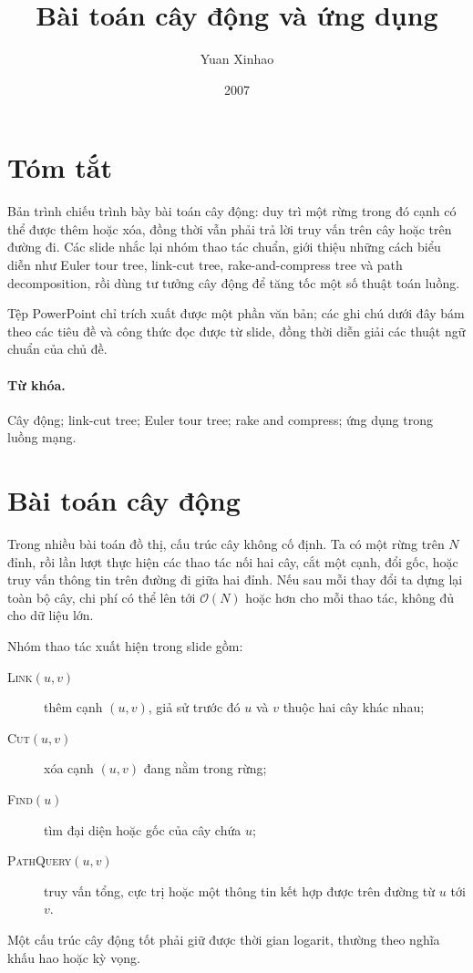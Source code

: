 \documentclass[11pt]{article}
\title{Bài toán cây động và ứng dụng}
\author{Yuan Xinhao}
\date{2007}
\newcommand{\Oh}{\mathcal{O}}
\begin{document}
\maketitle


\section*{Tóm tắt}

Bản trình chiếu trình bày bài toán cây động: duy trì một rừng trong đó cạnh
có thể được thêm hoặc xóa, đồng thời vẫn phải trả lời truy vấn trên cây hoặc
trên đường đi. Các slide nhắc lại nhóm thao tác chuẩn, giới thiệu những cách
biểu diễn như Euler tour tree, link-cut tree, rake-and-compress tree và path
decomposition, rồi dùng tư tưởng cây động để tăng tốc một số thuật toán luồng.

Tệp PowerPoint chỉ trích xuất được một phần văn bản; các ghi chú dưới đây bám
theo các tiêu đề và công thức đọc được từ slide, đồng thời diễn giải các
thuật ngữ chuẩn của chủ đề.

\paragraph{Từ khóa.}
Cây động; link-cut tree; Euler tour tree; rake and compress; ứng dụng trong
luồng mạng.

\section{Bài toán cây động}

Trong nhiều bài toán đồ thị, cấu trúc cây không cố định. Ta có một rừng trên
\(N\) đỉnh, rồi lần lượt thực hiện các thao tác nối hai cây, cắt một cạnh,
đổi gốc, hoặc truy vấn thông tin trên đường đi giữa hai đỉnh. Nếu sau mỗi
thay đổi ta dựng lại toàn bộ cây, chi phí có thể lên tới \(\Oh(N)\) hoặc hơn
cho mỗi thao tác, không đủ cho dữ liệu lớn.

Nhóm thao tác xuất hiện trong slide gồm:
\begin{description}
  \item[\textsc{Link}$(u,v)$] thêm cạnh \((u,v)\), giả sử trước đó \(u\) và
  \(v\) thuộc hai cây khác nhau;
  \item[\textsc{Cut}$(u,v)$] xóa cạnh \((u,v)\) đang nằm trong rừng;
  \item[\textsc{Find}$(u)$] tìm đại diện hoặc gốc của cây chứa \(u\);
  \item[\textsc{PathQuery}$(u,v)$] truy vấn tổng, cực trị hoặc một thông tin
  kết hợp được trên đường từ \(u\) tới \(v\).
\end{description}
Một cấu trúc cây động tốt phải giữ được thời gian logarit, thường theo nghĩa
khấu hao hoặc kỳ vọng.
\end{document}

